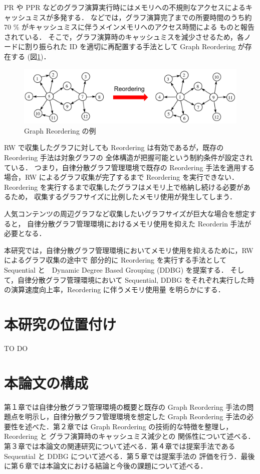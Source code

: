 PR や PPR などのグラフ演算実行時にはメモリへの不規則なアクセスによるキャッシュミスが多発する．
\cite{wei2016speedup,zhang2017making} などでは，グラフ演算完了までの所要時間のうち約 70 \% がキャッシュミスに伴うメインメモリへのアクセス時間による
ものと報告されている．
そこで，グラフ演算時のキャッシュミスを減少させるため，各ノードに割り振られた ID を適切に再配置する手法として 
Graph Reordering が存在する (図\ref{reordering_intro})．
\begin{figure}[t]
  \centering
  \includegraphics[width=\linewidth]{./figure/reordering_intro.pdf}
  \caption{Graph Reordering の例}
  \label{reordering_intro}
\end{figure}
RW で収集したグラフに対しても Reordering は有効であるが，既存の Reordering 手法は対象グラフの
全体構造が把握可能という制約条件が設定されている．
つまり，自律分散グラフ管理環境で既存の Reordering 手法を適用する場合，RW によるグラフ収集が完了するまで Reordering を実行できない．
Reordering を実行するまで収集したグラフはメモリ上で格納し続ける必要があるため，
収集するグラフサイズに比例したメモリ使用が発生してしまう．

人気コンテンツの周辺グラフなど収集したいグラフサイズが巨大な場合を想定すると，
自律分散グラフ管理環境におけるメモリ使用を抑えた Reorderin 手法が必要となる．

本研究では，自律分散グラフ管理環境においてメモリ使用を抑えるために，RW によるグラフ収集の途中で
部分的に Reordering を実行する手法として Sequential と　Dynamic Degree Based Grouping (DDBG) を提案する．
そして，自律分散グラフ管理環境において Sequential, DDBG をそれぞれ実行した時の演算速度向上率，Reordering に伴うメモリ使用量
を明らかにする．
\section{本研究の位置付け}
TO DO
\section{本論文の構成}
第１章では自律分散グラフ管理環境の概要と既存の Graph Reordering 手法の問題点を明示し，自律分散グラフ管理環境を想定した
Graph Reordering 手法の必要性を述べた．第２章では Graph Reordering の技術的な特徴を整理し，Reordering と グラフ演算時のキャッシュミス減少との
関係性について述べる．第３章では本論文の関連研究について述べる．第４章では提案手法である Sequential と DDBG について述べる．第５章では提案手法の
評価を行う．最後に第６章では本論文における結論と今後の課題について述べる．